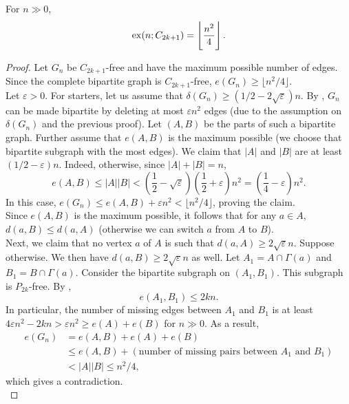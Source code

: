 			\begin{ftheo}
				For $n\gg 0$,
				\[ \operatorname{ex}(n;C_{2k+1}) = \left\lfloor \frac{n^2}{4} \right\rfloor. \]
			\end{ftheo}
			\begin{proof}
				Let $G_n$ be $C_{2k+1}$-free and have the maximum possible number of edges. Since the complete bipartite graph is $C_{2k+1}$-free, $e(G_n) \ge \lfloor n^2/4 \rfloor$.\\
				Let $\varepsilon > 0$. For starters, let us assume that $\delta(G_n) \ge (1/2 - 2\sqrt{\varepsilon})n$. By , $G_n$ can be made bipartite by deleting at most $\varepsilon n^2$ edges (due to the assumption on $\delta(G_n)$ and the previous proof). Let $(A,B)$ be the parts of such a bipartite graph. Further assume that $e(A,B)$ is the maximum possible (we choose that bipartite subgraph with the most edges). We claim that $|A|$ and $|B|$ are at least $(1/2 - \varepsilon)n$. Indeed, otherwise, since $|A|+|B|=n$,
				\[ e(A,B) \le |A||B| < \left( \frac{1}{2} - \sqrt{\varepsilon} \right) \left( \frac{1}{2} + \varepsilon \right) n^2 = \left( \frac{1}{4} - \varepsilon \right)n^2. \]
				In this case, $e(G_n) \le e(A,B) + \varepsilon n^2 < \lfloor n^2/4\rfloor$, proving the claim.\\

				Since $e(A,B)$ is the maximum possible, it follows that for any $a\in A$, $d(a,B) \le d(a,A)$ (otherwise we can switch $a$ from $A$ to $B$).\\
				Next, we claim that no vertex $a$ of $A$ is such that $d(a,A) \ge 2\sqrt{\varepsilon} n$. Suppose otherwise. We then have $d(a,B) \ge 2\sqrt{\varepsilon} n$ as well. Let $A_1 = A \cap \Gamma(a)$ and $B_1 = B \cap \Gamma(a)$. Consider the bipartite subgraph on $(A_1,B_1)$. This subgraph is $P_{2k}$-free. By ,
				\[ e(A_1, B_1) \le 2kn. \]
				In particular, the number of missing edges between $A_1$ and $B_1$ is at least $4\varepsilon n^2 - 2kn > \varepsilon n^2 \ge e(A) + e(B)$ for $n\gg 0$. As a result,
				\begin{align*}
					e(G_n) &= e(A,B) + e(A) + e(B) \\
						&\le e(A,B) + (\text{number of missing pairs between $A_1$ and $B_1$}) \\
						&< |A||B| \le n^2/4,
				\end{align*}
				which gives a contradiction.\\


\end{proof}
